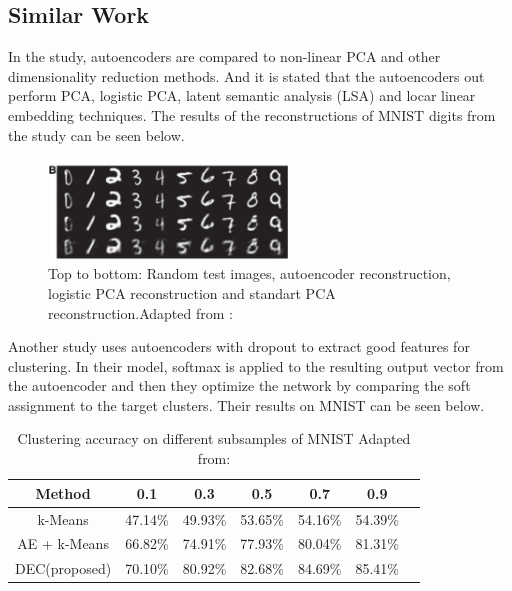 \documentclass[journal]{IEEEtran}
\begin{document}
\subsection{Similar Work}

In the study\cite{hinton2006reducing}, autoencoders are compared to non-linear PCA and other dimensionality reduction methods. And it is stated that the autoencoders out perform PCA, logistic PCA, latent semantic analysis (LSA) and locar linear embedding techniques. The results of the reconstructions of MNIST digits from the study can be seen below.

\begin{figure}[!ht]
  \centering
  \includegraphics[width=2.5in]{images/hinton_mnist.png}
  \caption{Top to bottom: Random test images, autoencoder reconstruction, logistic PCA reconstruction and standart PCA reconstruction.\newline Adapted from : \cite{hinton2006reducing}}
  \label{fig_hinton_mnist}
  \end{figure}

  \par

Another study \cite{xie2016unsupervised} uses autoencoders with dropout to extract good features for clustering.
In their model, softmax is applied to the resulting output vector from the autoencoder and then they optimize the network by comparing the soft assignment to the target clusters. Their results on MNIST can be seen below. 

\begin{table}[!ht]
  \renewcommand{\arraystretch}{1.3}
  \caption{Clustering accuracy on different subsamples of MNIST\newline
  Adapted from: \cite{xie2016unsupervised}}
  \label{tab_res_clus}
  \centering
  \begin{tabular}{|c||c|c|c|c|c|c|}
  \hline
   Method  &    0.1 &  0.3 &  0.5 & 0.7 &  0.9  \\
  \hline
  \hline
  k-Means &    47.14\% &   49.93\% &     53.65\%   &    54.16\%  &   54.39\% \\
  \hline
  AE + k-Means & 66.82\% &   74.91\% &     77.93\%   &    80.04\%  &   81.31\% \\
  \hline
  DEC(proposed) &  70.10\% &   80.92\% &     82.68\%   &    84.69\%  &   85.41\% \\
  \hline
  \end{tabular}
  \end{table}
\end{document}
